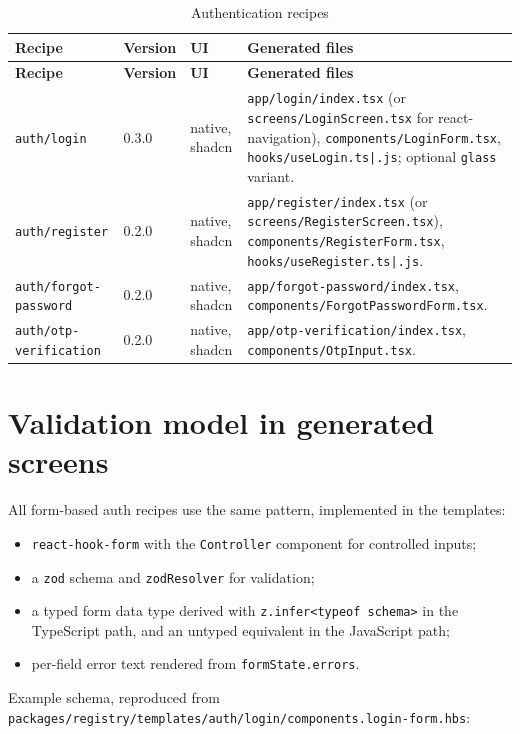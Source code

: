 \begin{longtable}{@{}L{3.6cm}L{1.5cm}L{1.9cm}L{7.4cm}@{}}
\caption{Authentication recipes}\\
\toprule
\textbf{Recipe} & \textbf{Version} & \textbf{UI} & \textbf{Generated files} \\
\midrule
\endfirsthead
\toprule
\textbf{Recipe} & \textbf{Version} & \textbf{UI} & \textbf{Generated files} \\
\midrule
\endhead
\texttt{auth/login} & 0.3.0 & native, shadcn & \texttt{app/login/index.tsx} (or
\texttt{screens/LoginScreen.tsx} for react-navigation),
\texttt{components/LoginForm.tsx}, \texttt{hooks/useLogin.ts|.js}; optional
\texttt{glass} variant. \\
\texttt{auth/register} & 0.2.0 & native, shadcn & \texttt{app/register/index.tsx} (or
\texttt{screens/RegisterScreen.tsx}), \texttt{components/RegisterForm.tsx},
\texttt{hooks/useRegister.ts|.js}. \\
\texttt{auth/forgot-password} & 0.2.0 & native, shadcn &
\texttt{app/forgot-password/index.tsx},
\texttt{components/ForgotPasswordForm.tsx}. \\
\texttt{auth/otp-verification} & 0.2.0 & native, shadcn &
\texttt{app/otp-verification/index.tsx}, \texttt{components/OtpInput.tsx}. \\
\bottomrule
\end{longtable}

\section{Validation model in generated screens}

All form-based auth recipes use the same pattern, implemented in the templates:

\begin{itemize}
  \item \texttt{react-hook-form} with the \texttt{Controller} component for
        controlled inputs;
  \item a \texttt{zod} schema and \texttt{zodResolver} for validation;
  \item a typed form data type derived with \texttt{z.infer<typeof schema>} in the
        TypeScript path, and an untyped equivalent in the JavaScript path;
  \item per-field error text rendered from \texttt{formState.errors}.
\end{itemize}

Example schema, reproduced from
\texttt{packages/registry/templates/auth/login/components.login-form.hbs}:

